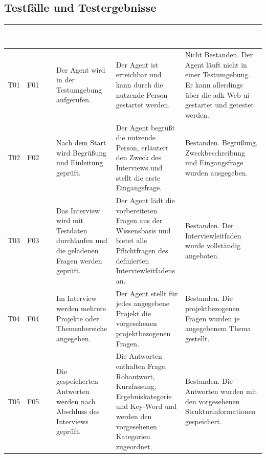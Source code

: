 \documentclass[
  10pt,
  ngerman,
  a4paper,
  toc=graduated,
  numbers=noenddot,
  headings=standardclasses,
  nonumberlist
]{scrartcl}
\begin{document}
\newpage
\subsection{Testfälle und Testergebnisse}
\label{anhang_testfaelle_testergebnisse}

\begin{table}[H]
\centering
\begin{tabularx}{\textwidth}{|L{1.0cm}|L{1.5cm}|Y|Y|L{2.6cm}|}
\hline
{}
\textcolor{white}{\textbf{ID}} 
& \textcolor{white}{\textbf{Bezug}} 
& \textcolor{white}{\textbf{Testfall}} 
& \textcolor{white}{\textbf{Erwartetes Ergebnis}} 
& \textcolor{white}{\textbf{Ergebnis}} \\
\hline

T01 
& F01 
& Der Agent wird in der Testumgebung aufgerufen. 
& Der Agent ist erreichbar und kann durch die nutzende Person gestartet werden. 
& Nicht Bestanden. Der Agent läuft nicht in einer Testumgebung. Er kann allerdings über die \gls{adk} Web \gls{ui} gestartet und getestet werden. \\
\hline

T02 
& F02 
& Nach dem Start wird Begrüßung und Einleitung geprüft. 
& Der Agent begrüßt die nutzende Person, erläutert den Zweck des Interviews und stellt die erste Eingangsfrage. 
& Bestanden. Begrüßung, Zweckbeschreibung und Eingangsfrage wurden ausgegeben. \\
\hline

T03 
& F03 
& Das Interview wird mit Testdaten durchlaufen und die geladenen Fragen werden geprüft. 
& Der Agent lädt die vorbereiteten Fragen aus der Wissensbasis und bietet alle Pflichtfragen des definierten Interviewleitfadens an. 
& Bestanden. Der Interviewleitfaden wurde vollständig angeboten. \\
\hline

T04 
& F04 
& Im Interview werden mehrere Projekte oder Themenbereiche angegeben. 
& Der Agent stellt für jedes angegebene Projekt die vorgesehenen projektbezogenen Fragen. 
& Bestanden. Die projektbezogenen Fragen wurden je angegebenem Thema gestellt. \\
\hline

T05 
& F05 
& Die gespeicherten Antworten werden nach Abschluss des Interviews geprüft. 
& Die Antworten enthalten Frage, Rohantwort, Kurzfassung, Ergebniskategorie und Key-Word und werden den vorgesehenen Kategorien zugeordnet. 
& Bestanden. Die Antworten wurden mit den vorgesehenen Strukturinformationen gespeichert. \\
\hline


\end{tabularx}
\end{table}
\end{document}
